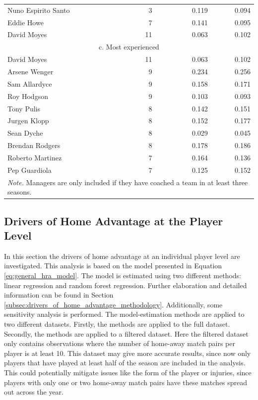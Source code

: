 \begin{table}[htbp]
\begin{spacing}{1.5}
\begin{tabular}{lrrrr}
        Nuno Espirito Santo & 3     &       & 0.119 & 0.094 \\
        Eddie Howe & 7     &       & 0.141 & 0.095 \\
        David Moyes & 11    &       & 0.063 & 0.102 \\
        \midrule
        \multicolumn{5}{c}{c. Most experienced} \\
        \midrule
        David Moyes & 11    &       & 0.063 & 0.102 \\
        Arsene Wenger & 9     &       & 0.234 & 0.256 \\
        Sam Allardyce & 9     &       & 0.158 & 0.171 \\
        Roy Hodgson & 9     &       & 0.103 & 0.093 \\
        Tony Pulis & 8     &       & 0.142 & 0.151 \\
        Jurgen Klopp & 8     &       & 0.152 & 0.177 \\
        Sean Dyche & 8     &       & 0.029 & 0.045 \\
        Brendan Rodgers & 8     &       & 0.178 & 0.186 \\
        Roberto Martinez & 7     &       & 0.164 & 0.136 \\
        Pep Guardiola & 7     &       & 0.125 & 0.152 \\
        \bottomrule
        \bottomrule
        \multicolumn{5}{p{12cm}}{\footnotesize\textit{Note.} Managers are only included if they have coached a team in at least three seasons.}
    \end{tabular}
    \end{spacing}
\end{table}

\subsection{Drivers of Home Advantage at the Player Level}
\label{subsec:driver_of_home_advantage}
In this section the drivers of home advantage at an individual player level are investigated. This analysis is based on the model presented in Equation \ref{eq:general_hra_model}. The model is estimated using two different methods: linear regression and random forest regression. Further elaboration and detailed information can be found in Section \ref{subsec:drivers_of_home_advantage_methodology}. Additionally, some sensitivity analysis is performed. The model-estimation methods are applied to two different datasets. Firstly, the methods are applied to the full dataset. Secondly, the methods are applied to a filtered dataset. Here the filtered dataset only contains observations where the number of home-away match pairs per player is at least 10. This dataset may give more accurate results, since now only players that have played at least half of the season are included in the analysis. This could potentially mitigate issues like the form of the player or injuries, since players with only one or two home-away match pairs have these matches spread out across the year.


